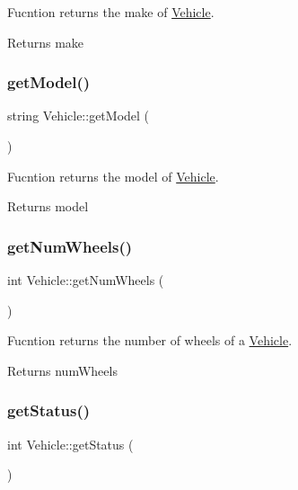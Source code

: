 Fucntion returns the make of \hyperlink{class_vehicle}{Vehicle}. \begin{DoxyReturn}{Returns}
make 
\end{DoxyReturn}
\mbox{\label{class_vehicle_a4ea5cae65802d874f9035f98cafaf51c}} 
\subsubsection{\texorpdfstring{get\+Model()}{getModel()}}
{\footnotesize\ttfamily string Vehicle\+::get\+Model (\begin{DoxyParamCaption}{ }\end{DoxyParamCaption})}

Fucntion returns the model of \hyperlink{class_vehicle}{Vehicle}. \begin{DoxyReturn}{Returns}
model 
\end{DoxyReturn}
\mbox{\label{class_vehicle_afd8d35a0deef1e846396f90737be9655}} 
\subsubsection{\texorpdfstring{get\+Num\+Wheels()}{getNumWheels()}}
{\footnotesize\ttfamily int Vehicle\+::get\+Num\+Wheels (\begin{DoxyParamCaption}{ }\end{DoxyParamCaption})}

Fucntion returns the number of wheels of a \hyperlink{class_vehicle}{Vehicle}. \begin{DoxyReturn}{Returns}
num\+Wheels 
\end{DoxyReturn}
\mbox{\label{class_vehicle_a835b1213216a5821abab0250231f6f2b}} 
\subsubsection{\texorpdfstring{get\+Status()}{getStatus()}}
{\footnotesize\ttfamily int Vehicle\+::get\+Status (\begin{DoxyParamCaption}{ }\end{DoxyParamCaption})}


